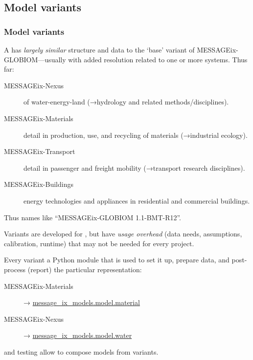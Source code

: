 \documentclass[12pt,aspectratio=169]{beamer}
\begin{document}
\subsection{Model variants}

\begin{frame}[allowframebreaks]
\frametitle{Model variants}

A  has \emph{largely similar} structure and data to the ‘base’ variant of MESSAGEix-GLOBIOM—usually with added resolution related to one or more systems. Thus far:

\medskip
\begin{description}
  \item [MESSAGEix-Nexus] of water-energy-land (→hydrology and related methods/disciplines).
  \item [MESSAGEix-Materials] detail in production, use, and recycling of materials (→industrial ecology).
  \item [MESSAGEix-Transport] detail in passenger and freight mobility (→transport research disciplines).
  \item [MESSAGEix-Buildings] energy technologies and appliances in residential and commercial buildings.
\end{description}

\medskip
Thus names like “MESSAGEix-GLOBIOM 1.1-BMT-R12”.

\framebreak

Variants are developed for , but have \emph{usage overhead} (data needs, assumptions, calibration, runtime) that may not be needed for every project.

\bigskip
Every variant  a Python module that is used to set it up, prepare data, and post-process (report) the particular representation:
\begin{description}
  \item [MESSAGEix-Materials] → \href{https://docs.messageix.org/projects/models/en/latest/material/index.html}{\ttfamily message\_ix\_models.model.material}
  \item [MESSAGEix-Nexus] → \href{https://docs.messageix.org/projects/models/en/latest/water/index.html}{\ttfamily message\_ix\_models.model.water}
\end{description}

\bigskip
{} and testing allow to compose models from variants.

\end{frame}
\end{document}

